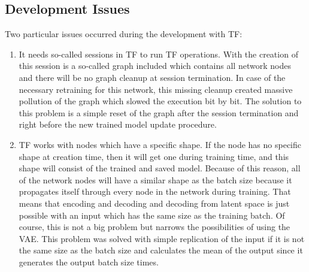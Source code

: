 \documentclass[MGS,Master,english]{twbook}%
\begin{document}
\subsection{Development Issues}
Two particular issues occurred during the development with TF:
\begin{enumerate}
	\item It needs so-called sessions in TF to run TF operations. With the creation of this session is a so-called graph included which contains all network nodes and there will be no graph cleanup at session termination. In case of the necessary retraining for this network, this missing cleanup created massive pollution of the graph which slowed the execution bit by bit. The solution to this problem is a simple reset of the graph after the session termination and right before the new trained model update procedure.
	\item TF works with nodes which have a specific shape.  If the node has no specific shape at creation time, then it will get one during training time, and this shape will consist of the trained and saved model. Because of this reason, all of the network nodes will have a similar shape as the batch size because it propagates itself through every node in the network during training. That means that encoding and decoding and decoding from latent space is just possible with an input which has the same size as the training batch. Of course, this is not a big problem but narrows the possibilities of using the VAE. This problem was solved with simple replication of the input if it is not the same size as the batch size and calculates the mean of the output since it generates the output batch size times.
\end{enumerate}
\end{document}
